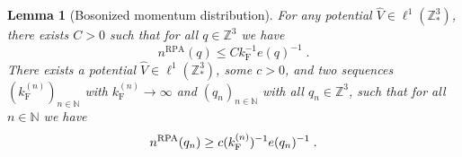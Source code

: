\documentclass[12pt,a4paper]{article}
\numberwithin{equation}{section}
\newcommand{\NNN}{\mathbb{N}}
\newcommand{\1}{\mathbb{I}}
\newcommand{\F}{\mathrm{F}}
\newcommand{\RPA}{\mathrm{RPA}}
\newcommand{\Z}{\mathbb{Z}}
\theoremstyle{plain}
\newtheorem{lemma}[theorem]{Lemma}
\theoremstyle{definition}
\theoremstyle{remark}
\theoremstyle{plain}
\theoremstyle{definition}
\theoremstyle{remark}
\begin{document}
\begin{lemma}[Bosonized momentum distribution] \label{lem:nqb_bounds}
For any potential $ \hat{V} \in \ell^1(\Z^3_*) $, there exists $ C > 0 $
such that for all $ q \in \Z^3 $ we have
\begin{equation} \label{eq:nqb_upperbound}
	n^{\RPA}(q)
	\le C k_{\F}^{-1} e(q)^{-1} \;.
\end{equation}
There exists a potential $ \hat{V} \in \ell^1(\Z^3_*) $, some $ c > 0 $, and two sequences $ (k_{\F}^{(n)})_{n \in \NNN}$ with $ k_{\F}^{(n)} \to \infty $ and $ (q_n)_{n \in \NNN}$ with all $q_n \in \Z^3 $, such that for all $ n \in \NNN $ we have
\begin{equation} \label{eq:nqb_lowerbound}
	n^{\textnormal{RPA}}(q_n)
	\ge c (k_{\F}^{(n)})^{-1} e(q_n)^{-1} \;.
\end{equation}
\end{lemma}
\end{document}
